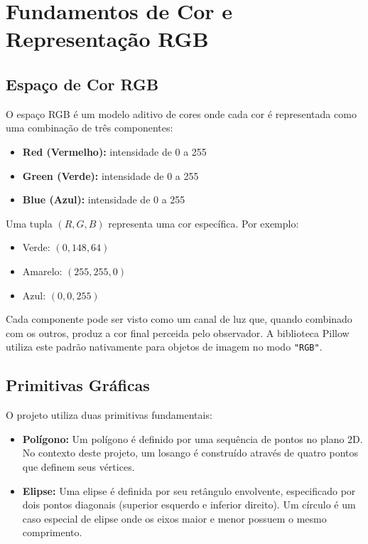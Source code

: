 \documentclass{article}
\begin{document}
\section{Fundamentos de Cor e Representação RGB}

\subsection{Espaço de Cor RGB}

O espaço RGB é um modelo aditivo de cores onde cada cor é representada como uma combinação de três componentes:
\begin{itemize}
    \item \textbf{Red (Vermelho):} intensidade de 0 a 255
    \item \textbf{Green (Verde):} intensidade de 0 a 255
    \item \textbf{Blue (Azul):} intensidade de 0 a 255
\end{itemize}

Uma tupla $(R, G, B)$ representa uma cor específica. Por exemplo:
\begin{itemize}
    \item Verde: $(0, 148, 64)$
    \item Amarelo: $(255, 255, 0)$
    \item Azul: $(0, 0, 255)$
\end{itemize}

Cada componente pode ser visto como um canal de luz que, quando combinado com os outros, produz a cor final perceida pelo observador. A biblioteca Pillow utiliza este padrão nativamente para objetos de imagem no modo \texttt{"RGB"}.

\subsection{Primitivas Gráficas}

O projeto utiliza duas primitivas fundamentais:

\begin{itemize}
    \item \textbf{Polígono:} Um polígono é definido por uma sequência de pontos no plano 2D. No contexto deste projeto, um losango é construído através de quatro pontos que definem seus vértices.
    \item \textbf{Elipse:} Uma elipse é definida por seu retângulo envolvente, especificado por dois pontos diagonais (superior esquerdo e inferior direito). Um círculo é um caso especial de elipse onde os eixos maior e menor possuem o mesmo comprimento.
\end{itemize}
\end{document}
